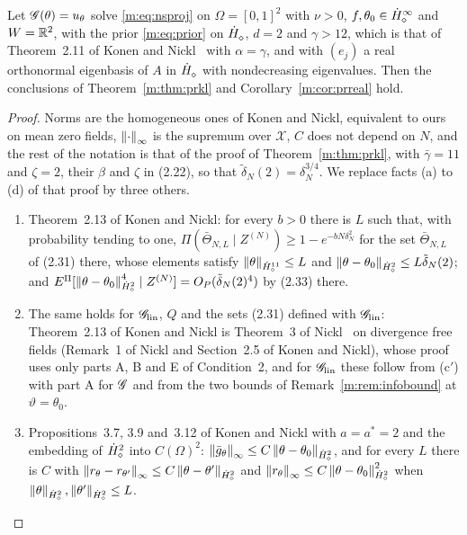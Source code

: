 \begin{proposition}\label{m:prop:prklns}
Let $\mathscr{G}(\theta)=u_\theta$ solve \eqref{m:eq:nsproj} on $\Omega=[0,1]^2$ with $\nu>0$, $f,\theta_0\in\dot H^{\infty}_\diamond$ and $W=\mathbb{R}^2$, with the prior \eqref{m:eq:prior} on $\dot H^{}_\diamond$, $d=2$ and $\gamma>12$, which is that of Theorem~2.11 of Konen and Nickl~\cite{konennickl2026} with $\alpha=\gamma$, and with $(e_j)$ a real orthonormal eigenbasis of $A$ in $\dot H^{}_\diamond$ with nondecreasing eigenvalues. Then the conclusions of Theorem~\ref{m:thm:prkl} and Corollary~\ref{m:cor:prreal} hold.
\end{proposition}

\begin{proof}
Norms are the homogeneous ones of Konen and Nickl, equivalent to ours on mean zero fields, $\left\|\cdot\right\|_\infty$ is the supremum over $\mathcal X$, $C$ does not depend on $N$, and the rest of the notation is that of the proof of Theorem~\ref{m:thm:prkl}, with $\bar\gamma=11$ and $\zeta=2$, their $\beta$ and $\zeta$ in (2.22), so that $\tilde\delta_N(2)=\delta_N^{3/4}$. We replace facts (a) to (d) of that proof by three others.
\begin{enumerate}[label=(\alph*$'$),nosep]
\item Theorem~2.13 of Konen and Nickl: for every $b>0$ there is $L$ such that, with probability tending to one, $\Pi(\bar\Theta_{N,L}\mid Z^{(N)})\ge1-e^{-bN\delta_N^2}$ for the set $\bar\Theta_{N,L}$ of (2.31) there, whose elements satisfy $\left\|\theta\right\|_{\dot H^{11}_\diamond}\le L$ and $\left\|\theta-\theta_0\right\|_{\dot H^{2}_\diamond}\le L\tilde\delta_N(2)$; and $E^\Pi[\left\|\theta-\theta_0\right\|^4_{\dot H^{2}_\diamond}\mid Z^{(N)}]=O_P(\tilde\delta_N(2)^4)$ by (2.33) there.
\item The same holds for $\mathscr{G}_{\rm lin}$, $Q$ and the sets (2.31) defined with $\mathscr{G}_{\rm lin}$: Theorem~2.13 of Konen and Nickl is Theorem~3 of Nickl~\cite{nicklbvm2024} on divergence free fields (Remark~1 of Nickl and Section~2.5 of Konen and Nickl), whose proof uses only parts A, B and E of Condition~2, and for $\mathscr{G}_{\rm lin}$ these follow from (c$'$) with part A for $\mathscr{G}$ and from the two bounds of Remark~\ref{m:rem:infobound} at $\vartheta=\theta_0$.
\item Propositions~3.7, 3.9 and~3.12 of Konen and Nickl with $a=a^*=2$ and the embedding of $\dot H^{2}_\diamond$ into $C(\Omega)^2$: $\left\|\bar g_\theta\right\|_\infty\le C\left\|\theta-\theta_0\right\|_{\dot H^{2}_\diamond}$, and for every $L$ there is $C$ with $\left\|r_\theta-r_{\theta'}\right\|_\infty\le C\left\|\theta-\theta'\right\|_{\dot H^{2}_\diamond}$ and $\left\|r_\theta\right\|_\infty\le C\left\|\theta-\theta_0\right\|^2_{\dot H^{2}_\diamond}$ when $\left\|\theta\right\|_{\dot H^{2}_\diamond},\left\|\theta'\right\|_{\dot H^{2}_\diamond}\le L$.

\end{enumerate}
\end{proof}
